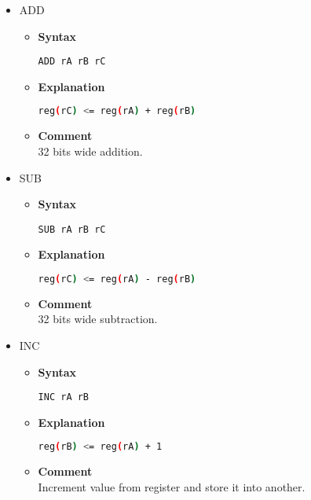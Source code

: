 \begin{itemize}
    \item ADD
    \begin{itemize}
        \item \textbf{Syntax}
        \begin{lstlisting}[language={[x86masm]Assembler}, frame=single]
    ADD rA rB rC
        \end{lstlisting}
        \item \textbf{Explanation}
        \begin{lstlisting}[language=bash, frame=single]
    reg(rC) <= reg(rA) + reg(rB)
        \end{lstlisting}
        \item \textbf{Comment} \\
    32 bits wide addition.
    \end{itemize}

    \item SUB
    \begin{itemize}
        \item \textbf{Syntax}
        \begin{lstlisting}[language={[x86masm]Assembler}, frame=single]
    SUB rA rB rC
        \end{lstlisting}
        \item \textbf{Explanation}
        \begin{lstlisting}[language=bash, frame=single]
    reg(rC) <= reg(rA) - reg(rB)
        \end{lstlisting}
        \item \textbf{Comment} \\
    32 bits wide subtraction.
    \end{itemize}

    \item INC
    \begin{itemize}
        \item \textbf{Syntax}
        \begin{lstlisting}[language={[x86masm]Assembler}, frame=single]
    INC rA rB
        \end{lstlisting}
        \item \textbf{Explanation}
        \begin{lstlisting}[language=bash, frame=single]
    reg(rB) <= reg(rA) + 1
        \end{lstlisting}
        \item \textbf{Comment} \\
    Increment value from register and store it into another.
    \end{itemize}


\end{itemize}
